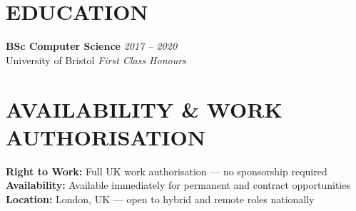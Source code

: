 \documentclass[11pt,a4paper]{article}
\begin{document}
\section*{EDUCATION}
\textbf{BSc Computer Science} \hfill \textit{2017 -- 2020} \\
University of Bristol \hfill \textit{First Class Honours}

\section*{AVAILABILITY \& WORK AUTHORISATION}
\textbf{Right to Work:} Full UK work authorisation --- no sponsorship required \\
\textbf{Availability:} Available immediately for permanent and contract opportunities \\
\textbf{Location:} London, UK --- open to hybrid and remote roles nationally
\end{document}
